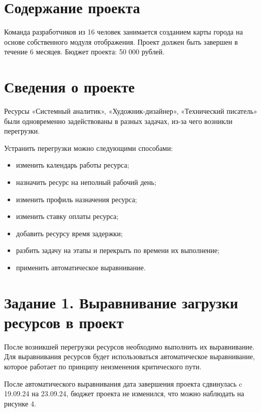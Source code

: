 \section*{Содержание проекта}
Команда разработчиков из 16 человек занимается созданием карты города на основе собственного модуля отображения. Проект должен быть завершен в течение 6 месяцев. Бюджет проекта: 50 000 рублей.

\section*{Сведения о проекте}


Ресурсы «Системный аналитик», «Художник-дизайнер», «Технический писатель» были одновременно задействованы в разных задачах, из-за чего возникли перегрузки.


Устранить перегрузки можно следующими способами:
\begin{itemize}[label = ---]
    \item изменить календарь работы ресурса;
    \item назначить ресурс на неполный рабочий день;
    \item изменить профиль назначения ресурса;
    \item изменить ставку оплаты ресурса;
    \item добавить ресурсу время задержки;
    \item разбить задачу на этапы и перекрыть по времени их выполнение;
    \item применить автоматическое выравнивание.
\end{itemize}

\section*{Задание 1. Выравнивание загрузки ресурсов в проект}

После возникшей перегрузки ресурсов необходимо выполнить их выравнивание. Для выравнивания ресурсов будет использоваться автоматическое выравнивание, которое работает по принципу неизменения критического пути.

После автоматического выравнивания дата завершения проекта сдвинулась c 19.09.24 на 23.09.24, бюджет проекта не изменился, что можно наблюдать на рисунке 4.

